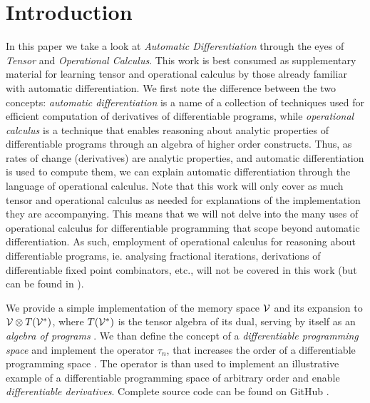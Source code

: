 \section{Introduction}\label{sec:introduction}

In this paper we take a look at \emph{Automatic Differentiation} through the eyes of \emph{Tensor} and \emph{Operational Calculus}. This work is best consumed as supplementary material for learning tensor and operational calculus by those already familiar with automatic differentiation. We first note the difference between the two concepts: \emph{automatic differentiation} is a name of a collection of techniques used for efficient computation of derivatives of differentiable programs, while \emph{operational calculus} is a technique that enables reasoning about analytic properties of differentiable programs through an algebra of higher order constructs. Thus, as rates of change (derivatives) are analytic properties, and automatic differentiation is used to compute them, we can explain automatic differentiation through the language of operational calculus. Note that this work will only cover as much tensor and operational calculus as needed for explanations of the implementation they are accompanying. This means that we will not delve into the many uses of operational calculus for differentiable programming that scope beyond automatic differentiation. As such, employment of operational calculus for reasoning about differentiable programs, ie. analysing fractional iterations, derivations of differentiable fixed point combinators, etc., will not be covered in this work (but can be found in \cite{OperationalCalculus}).

We provide a simple implementation of the memory space $\mathcal{V}$ and its expansion to $\mathcal{V}\otimes T(\mathcal{V}^*)$, where $T(\mathcal{V}^*)$ is the tensor algebra of its dual, serving by itself as an \emph{algebra of programs} \cite[Definition~4.1]{OperationalCalculus}. We than define the concept of a \emph{differentiable programming space} and implement the operator $\tau_n$, that increases the order of a differentiable programming space \cite[Proposition~5.1]{OperationalCalculus}. The operator is than used to implement an illustrative example of a differentiable programming space of arbitrary order and enable \emph{differentiable derivatives}.
Complete source code can be found on GitHub \cite{dCpp}.
